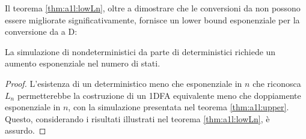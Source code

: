 Il teorema \ref{thm:a1l:lowLn}, oltre a dimostrare che le conversioni da  non possono essere migliorate significativamente, fornisce un lower bound esponenziale per la conversione da  a D:
\begin{corol}
	La simulazione di  nondeterministici da parte di  deterministici richiede un aumento esponenziale nel numero di stati.
\end{corol}
\begin{proof}
	L'esistenza di un  deterministico meno che esponenziale in $n$ che riconosca $L_n$ permetterebbe la costruzione di un 1DFA equivalente meno che doppiamente esponenziale in $n$, con la simulazione presentata nel teorema \ref{thm:a1l:upper}. Questo, considerando i risultati illustrati nel teorema \ref{thm:a1l:lowLn}, è assurdo.
\end{proof}
